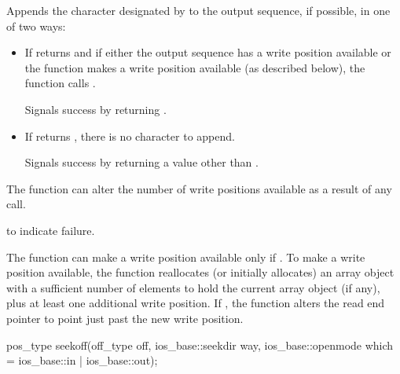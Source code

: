 \begin{itemdescr}
\pnum
\effects
Appends the character designated by  to the output
sequence, if possible, in one of two ways:
\begin{itemize}
\item
If
returns
and if either
the output sequence has a write position available or
the function makes a write position available
(as described below),
the function calls
.

Signals success by returning .

\item
If
returns
,
there is no character to append.

Signals success by returning a value other than
.
\end{itemize}

\pnum
\notes
The function can alter the number of write positions available as a
result of any call.

\pnum
\returns
{}
to indicate failure.

\pnum
The function can make a write position available only if
.
To make a write position available,
the function reallocates (or initially allocates) an array object
with a sufficient number of elements to hold
the current array object (if any), plus
at least
one additional write position.
If
,
the function alters the read end pointer
to point just past the new write position.
\end{itemdescr}

%
\begin{itemdecl}
pos_type seekoff(off_type off, ios_base::seekdir way,
                 ios_base::openmode which
                   = ios_base::in | ios_base::out);
\end{itemdecl}

